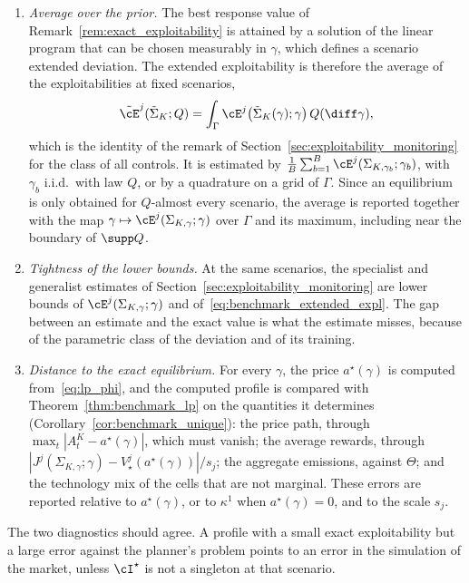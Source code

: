 \begin{enumerate}
        \item \emph{Average over the prior.} The best response value of Remark~\ref{rem:exact_exploitability} is attained by a solution of the linear program that can be chosen measurably in $\gamma$, which defines a scenario extended deviation. The extended exploitability is therefore the average of the exploitabilities at fixed scenarios,
        \begin{equation}
            \label{eq:benchmark_extended_expl}
            \tilde\cE^j(\tilde\Sigma_K; Q) = \int_\Gamma \cE^j\big(\tilde\Sigma_K(\gamma); \gamma\big)\, Q(\diff\gamma),
        \end{equation}
        which is the identity of the remark of Section~\ref{sec:exploitability_monitoring} for the class of all controls. It is estimated by $\frac{1}{B} \sum_{b=1}^B \cE^j(\Sigma_{K,\gamma_b}; \gamma_b)$, with $\gamma_b$ i.i.d.\ with law $Q$, or by a quadrature on a grid of $\Gamma$. Since an equilibrium is only obtained for $Q$-almost every scenario, the average is reported together with the map $\gamma \mapsto \cE^j(\Sigma_{K,\gamma}; \gamma)$ over $\Gamma$ and its maximum, including near the boundary of $\supp Q$.

        \item \emph{Tightness of the lower bounds.} At the same scenarios, the specialist and generalist estimates of Section~\ref{sec:exploitability_monitoring} are lower bounds of $\cE^j(\Sigma_{K,\gamma}; \gamma)$ and of~\eqref{eq:benchmark_extended_expl}. The gap between an estimate and the exact value is what the estimate misses, because of the parametric class of the deviation and of its training.

        \item \emph{Distance to the exact equilibrium.} For every $\gamma$, the price $a^\star(\gamma)$ is computed from~\eqref{eq:lp_phi}, and the computed profile is compared with Theorem~\ref{thm:benchmark_lp} on the quantities it determines (Corollary~\ref{cor:benchmark_unique}): the price path, through $\max_t |A^K_t - a^\star(\gamma)|$, which must vanish; the average rewards, through $|J^j(\Sigma_{K,\gamma}; \gamma) - V^j_\star(a^\star(\gamma))| / s_j$; the aggregate emissions, against $\Theta$; and the technology mix of the cells that are not marginal. These errors are reported relative to $a^\star(\gamma)$, or to $\kappa^1$ when $a^\star(\gamma) = 0$, and to the scale $s_j$.
    \end{enumerate}
    The two diagnostics should agree. A profile with a small exact exploitability but a large error against the planner's problem points to an error in the simulation of the market, unless $\cI^\star$ is not a singleton at that scenario.



